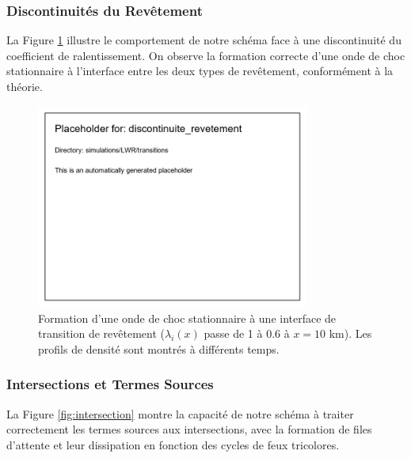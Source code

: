 \subsubsection{Discontinuités du Revêtement}
\label{subsubsec:discontinuites_revetement_test}

La Figure \ref{fig:discontinuite_revetement} illustre le comportement de notre schéma face à une discontinuité du coefficient de ralentissement. On observe la formation correcte d'une onde de choc stationnaire à l'interface entre les deux types de revêtement, conformément à la théorie.

\begin{figure}[htbp]
\centering
\includegraphics[width=0.8\textwidth]{simulations/LWR/transitions/discontinuite_revetement}
\caption{Formation d'une onde de choc stationnaire à une interface de transition de revêtement ($\lambda_i(x)$ passe de 1 à 0.6 à $x=10$ km). Les profils de densité sont montrés à différents temps.}
\label{fig:discontinuite_revetement}
\end{figure}

\subsubsection{Intersections et Termes Sources}
\label{subsubsec:intersections_test}

La Figure \ref{fig:intersection} montre la capacité de notre schéma à traiter correctement les termes sources aux intersections, avec la formation de files d'attente et leur dissipation en fonction des cycles de feux tricolores.

